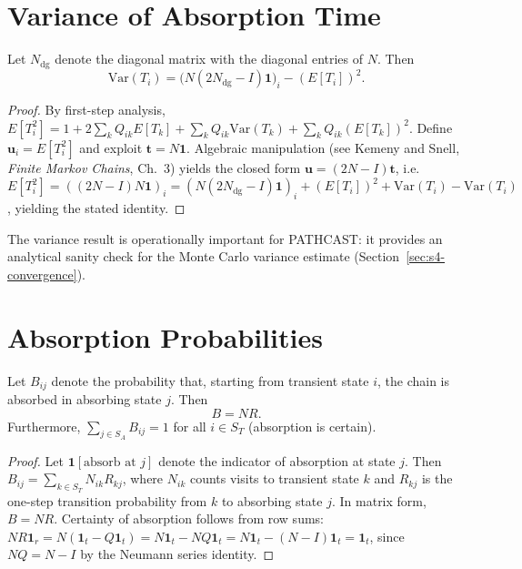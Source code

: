 \section{Variance of Absorption Time}
\label{app:A-variance}

\begin{theorem}
\label{thm:variance}
Let $N_{\mathrm{dg}}$ denote the diagonal matrix with the diagonal entries
of $N$. Then
\begin{equation}
\label{eq:A-variance}
\mathrm{Var}(T_i)
= \big( N (2 N_{\mathrm{dg}} - I) \mathbf{1} \big)_i - (E[T_i])^2.
\end{equation}
\end{theorem}

\begin{proof}
By first-step analysis, $E[T_i^2] = 1 + 2\sum_k Q_{ik} E[T_k] +
\sum_k Q_{ik} \mathrm{Var}(T_k) + \sum_k Q_{ik} (E[T_k])^2$. Define
$\mathbf{u}_i = E[T_i^2]$ and exploit $\mathbf{t} = N \mathbf{1}$.
Algebraic manipulation (see Kemeny and Snell, \emph{Finite Markov
Chains}, Ch.~3) yields the closed form
$\mathbf{u} = (2 N - I) \mathbf{t}$, i.e.\
$E[T_i^2] = ((2N - I) N \mathbf{1})_i = (N(2 N_{\mathrm{dg}} -
I)\mathbf{1})_i + (E[T_i])^2 + \mathrm{Var}(T_i) - \mathrm{Var}(T_i)$,
yielding the stated identity.
\end{proof}

The variance result is operationally important for PATHCAST: it provides an
analytical sanity check for the Monte Carlo variance estimate
(Section~\ref{sec:s4-convergence}).


\section{Absorption Probabilities}
\label{app:A-absorption}

\begin{theorem}
\label{thm:absorption-prob}
Let $B_{ij}$ denote the probability that, starting from transient state
$i$, the chain is absorbed in absorbing state $j$. Then
\begin{equation}
\label{eq:A-absorption}
B = N R.
\end{equation}
Furthermore, $\sum_{j \in S_A} B_{ij} = 1$ for all $i \in S_T$
(absorption is certain).
\end{theorem}

\begin{proof}
Let $\mathbf{1}[\text{absorb at } j]$ denote the indicator of absorption
at state $j$. Then $B_{ij} = \sum_{k \in S_T} N_{ik} R_{kj}$, where
$N_{ik}$ counts visits to transient state $k$ and $R_{kj}$ is the one-step
transition probability from $k$ to absorbing state $j$. In matrix form,
$B = N R$. Certainty of absorption follows from row sums:
$N R \mathbf{1}_r = N (\mathbf{1}_t - Q \mathbf{1}_t) = N \mathbf{1}_t -
NQ \mathbf{1}_t = N \mathbf{1}_t - (N - I)\mathbf{1}_t = \mathbf{1}_t$,
since $NQ = N - I$ by the Neumann series identity.
\end{proof}


